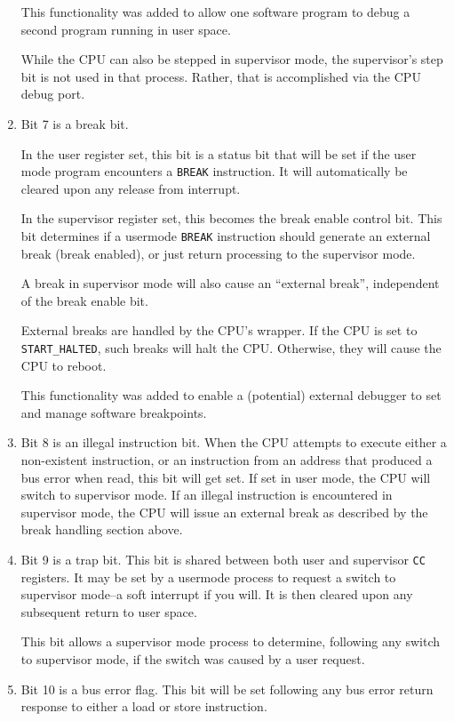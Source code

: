\documentclass{gqtekspec}
\begin{document}
\begin{enumerate}
	This functionality was added to allow one software program to debug
	a second program running in user space.

	While the CPU can also be stepped in supervisor mode, the supervisor's
	step bit is not used in that process.  Rather, that is accomplished
	via the CPU debug port.

\item Bit 7 is a break bit.

	In the user register set, this bit is a status bit that will be set if
	the user mode program encounters a {\tt BREAK} instruction.  It will
	automatically be cleared upon any release from interrupt.

	In the supervisor register set, this becomes the break enable control
	bit.  This bit determines if a usermode {\tt BREAK} instruction should
	generate an external break (break enabled), or just return processing
	to the supervisor mode.

	A break in supervisor mode will also cause an ``external break'',
	independent of the break enable bit.

	External breaks are handled by the CPU's wrapper.  If the CPU is set to
	{\tt START\_HALTED}, such breaks will halt the CPU.  Otherwise, they
	will cause the CPU to reboot.

	This functionality was added to enable a (potential) external debugger
	to set and manage software breakpoints.

\item Bit 8 is an illegal instruction bit.  When the CPU attempts to
	execute either a non-existent instruction, or an instruction from
	an address that produced a bus error when read, this bit will
	get set.  If set in user mode, the CPU will switch to supervisor mode.
	If an illegal instruction is encountered in supervisor mode,
	the CPU will issue an external break as described by the break
	handling section above.

\item Bit 9 is a trap bit.  This bit is shared between both user and supervisor
	{\tt CC} registers.  It may be set by a usermode process to request a
	switch to supervisor mode--a soft interrupt if you will.  It is
	then cleared upon any subsequent return to user space.

	This bit allows a supervisor mode process to determine, following any
	switch to supervisor mode, if the switch was caused by a user request.

\item Bit 10 is a bus error flag.  This bit will be set following any bus
	error return response to either a load or store instruction.


\end{enumerate}
\end{document}
